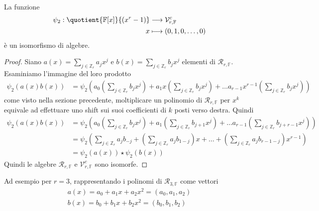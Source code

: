          

\begin{prop}
La funzione
\begin{align*}
\psi_{2}: \quotient{ \mathbb{F}[x] }{ (x^r -1 )} 
          &\longrightarrow  
          \mathcal{V}_{r,\mathbb{F} }^{c}  \\
              x 
              &\longmapsto 
              (0,1,0,\dots , 0) 
\end{align*}
è un isomorfismo di algebre.
\end{prop}

\begin{proof}
Siano $a(x) = \sum_{j \in \mathbb{Z}_{r} }a_{j} x^{j}$ e $b(x)= \sum_{j \in
\mathbb{Z}_{r} } b_{j} x^{j}$ elementi di $\mathcal{R}_{r, \mathbb{F}} $.
Esaminiamo l'immagine del loro prodotto
\begin{align*}
\psi_{2}(a(x)b(x)) 
&= \psi_{2}( 
a_{0}(\sum_{j \in \mathbb{Z}_{r} } b_{j} x^{j}) +   
a_{1}x(\sum_{j \in \mathbb{Z}_{r} } b_{j} x^{j}) +
\dots
a_{r-1}x^{r-1}(\sum_{j \in \mathbb{Z}_{r} } b_{j} x^{j})
)
\end{align*}
come visto nella sezione precedente, moltiplicare un polinomio di
$\mathcal{R}_{r, \mathbb{F}}$ per $x^k$ equivale ad effettuare uno shift sui
suoi coefficienti
di $k$ posti verso destra. Quindi
\begin{align*}
\psi_{2}(a(x)b(x)) 
&= \psi_{2}( 
a_{0}(\sum_{j \in \mathbb{Z}_{r} } b_{j} x^{j}) +   
a_{1}(\sum_{j \in \mathbb{Z}_{r} } b_{j+1} x^{j}) +
\dots
a_{r-1}(\sum_{j \in \mathbb{Z}_{r} } b_{j+r-1} x^{j})
) 
\\
&=
\psi_{2}(
\sum_{j \in \mathbb{Z}_{r} } a_{j} b_{-j} +
(\sum_{j \in \mathbb{Z}_{r} } a_{j} b_{1-j})x +
\dots +
(\sum_{j \in \mathbb{Z}_{r} } a_{j} b_{r-1-j})x^{r-1}) \\
&=\psi_{2}(a(x)) \star \psi_{2}(b(x))
\end{align*}
Quindi le algebre $\mathcal{R}_{r, \mathbb{F}}$ e $\mathcal{V}_{r,
\mathbb{F}}^{c}$ sono isomorfe.
\end{proof}
Ad esempio per $r = 3$, rappresentando i polinomi di $\mathcal{R}_{3,
\mathbb{F}} $ come vettori
\begin{align*}
 a(x) = a_{0} + a_{1}x+ a_{2}x^2 = (a_{0}, a_{1},a_{2}) 
 \\
 b(x) = b_{0} + b_{1}x+ b_{2}x^2 = (b_{0}, b_{1},b_{2})
\end{align*}
